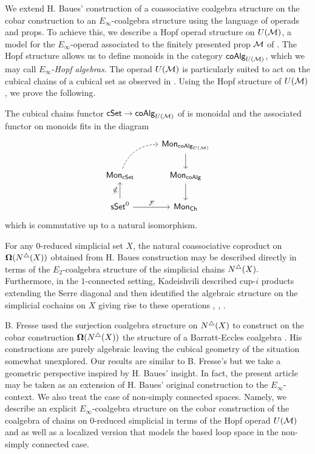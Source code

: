 We extend H. Baues' construction of a coassociative coalgebra structure on the cobar construction to an $E_{\infty}$-coalgebra structure using the language of operads and props.
To achieve this, we describe a Hopf operad structure on $U(\mathcal{M})$, a model for the $E_{\infty}$-operad associated to the finitely presented prop $\mathcal{M}$ of \cite{Medina20prop1}. The Hopf structure allows us to define monoids in the category $\mathsf{coAlg}_{U(\mathcal{M})}$, which we may call $E_{\infty}$-\textit{Hopf algebras}. The operad $U(\mathcal{M})$ is particularly suited to act on the cubical chains of a cubical set as observed in \cite{medina2021cubical}. 
Using the Hopf structure of $U(\mathcal{M})$, we prove the following.
\begin{theorem} \label{t:1st main thm in the intro}
    The cubical chains functor $\mathsf{cSet} \to \mathsf{coAlg}_{U(\mathcal{M})}$ of \cite{medina2021cubical} is monoidal and the associated functor on monoids fits in the diagram
    \begin{equation*}
    \begin{tikzcd}
    & \Mon_{\coAlg_{U(\M)}} \arrow[d] \\
    \Mon_{\cSet} \arrow[ru, dashed,  out=70, in=180] & \Mon_{\coAlg} \arrow[d] \\
    \sSet^0 \arrow[r, "\mathcal{F}"] \arrow[u, "\gcobar"] & \Mon_{\Ch}
    \end{tikzcd}
    \end{equation*}
    which is commutative up to a natural isomorphism.
\end{theorem} 

For any $0$-reduced simplicial set $X$, the natural coassociative coproduct on $\mathbf{\Omega} (N^{\triangle} (X))$ obtained from H. Baues construction may be described directly in terms of the $E_2$-coalgebra structure of the simplicial chains $N^{\triangle}(X).$ Furthermore, in  the $1$-connected setting, Kadeishvili described cup-$i$ products extending the Serre diagonal and then identified the algebraic structure on the simplicial cochains on $X$ giving rise to these operations \cite{Kadeishvili99coproducts},  \cite{Pilarczyk2016cubical}, \cite{Kadeishvili03cup-i}.

B. Fresse used the surjection coalgebra structure on $N^{\triangle}(X)$ to construct on the cobar construction $\mathbf{\Omega}(N^{\triangle}(X))$ the  structure of a Barratt-Eccles coalgebra \cite{Fresse03construction}. His constructions are purely algebraic leaving the cubical geometry of the situation somewhat unexplored. Our results are similar to B. Fresse's but we take a geometric perspective inspired by H. Baues' insight. In fact, the present article may be taken as an extension of H. Baues' original construction to the $E_{\infty}$-context. We also treat the case of non-simply connected spaces. Namely, we describe an explicit $E_{\infty}$-coalgebra structure on the cobar construction of the coalgebra of chains on $0$-reduced simplicial in terms of the Hopf operad $U(\mathcal{M})$ and as well as a localized version that models the based loop space in the non-simply connected case.  

